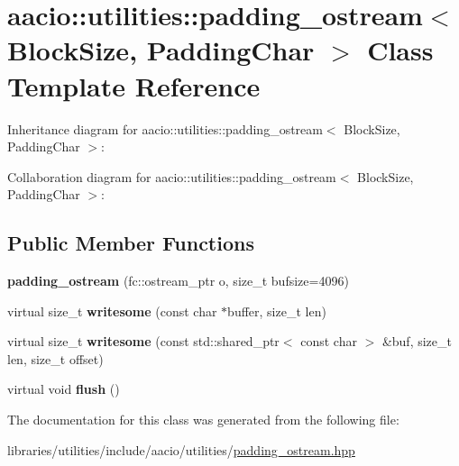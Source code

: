 \hypertarget{classaacio_1_1utilities_1_1padding__ostream}{}\section{aacio\+:\+:utilities\+:\+:padding\+\_\+ostream$<$ Block\+Size, Padding\+Char $>$ Class Template Reference}
\label{classaacio_1_1utilities_1_1padding__ostream}


Inheritance diagram for aacio\+:\+:utilities\+:\+:padding\+\_\+ostream$<$ Block\+Size, Padding\+Char $>$\+:


Collaboration diagram for aacio\+:\+:utilities\+:\+:padding\+\_\+ostream$<$ Block\+Size, Padding\+Char $>$\+:
\subsection*{Public Member Functions}
\begin{DoxyCompactItemize}
\item 
\mbox{\label{classaacio_1_1utilities_1_1padding__ostream_a43493d49e013028fc39f0c3e11f1e184}} 
{\bfseries padding\+\_\+ostream} (fc\+::ostream\+\_\+ptr o, size\+\_\+t bufsize=4096)
\item 
\mbox{\label{classaacio_1_1utilities_1_1padding__ostream_ac4ba087672b108e68c71efac868bff82}} 
virtual size\+\_\+t {\bfseries writesome} (const char $\ast$buffer, size\+\_\+t len)
\item 
\mbox{\label{classaacio_1_1utilities_1_1padding__ostream_ad731e4f0b713c66ba1a92c7d438e1944}} 
virtual size\+\_\+t {\bfseries writesome} (const std\+::shared\+\_\+ptr$<$ const char $>$ \&buf, size\+\_\+t len, size\+\_\+t offset)
\item 
\mbox{\label{classaacio_1_1utilities_1_1padding__ostream_ac99922c4e1270dac2843c235be36f79b}} 
virtual void {\bfseries flush} ()
\end{DoxyCompactItemize}


The documentation for this class was generated from the following file\+:\begin{DoxyCompactItemize}
\item 
libraries/utilities/include/aacio/utilities/\mbox{\hyperlink{padding__ostream_8hpp}{padding\+\_\+ostream.\+hpp}}\end{DoxyCompactItemize}
